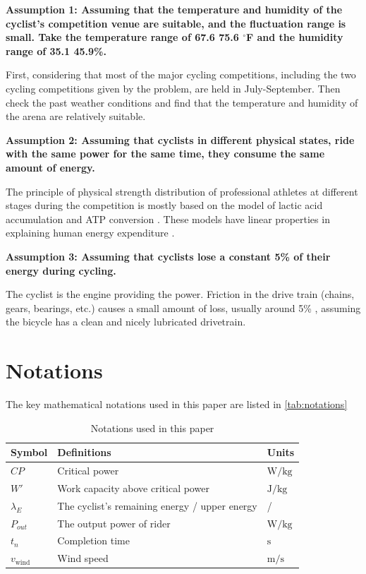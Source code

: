 \documentclass{mcmthesis}
\begin{document}
\noindent \textbf{Assumption 1: Assuming that the temperature and humidity of the cyclist’s competition venue
are suitable, and the fluctuation range is small. Take the temperature range of 67.6 \text{--} 75.6
$^\circ$F and the humidity range of 35.1 \text{--} 45.9\%.}

First, considering that most of the major cycling competitions, including the two cycling competitions given by the problem, are held in July-September. Then check the past weather conditions
and find that the temperature and humidity of the arena are relatively suitable.

\noindent \textbf{Assumption 2: Assuming that cyclists in different physical states, ride with the same power for
the same time, they consume the same amount of energy.}

The principle of physical strength distribution of professional athletes at different stages during
the competition is mostly based on the model of lactic acid accumulation and ATP conversion \cite{key6}.
These models have linear properties in explaining human energy expenditure \cite{key7}.

\noindent \textbf{Assumption 3: Assuming that cyclists lose a constant 5\% of their energy during cycling.}

The cyclist is the engine providing the power. Friction in the drive train (chains, gears, bearings,
etc.) causes a small amount of loss, usually around 5\% \cite{key8}, assuming the bicycle has a clean and
nicely lubricated drivetrain.
\section{Notations}
The key mathematical notations used in this paper are listed in \autoref{tab:notations}
\begin{table}[htbp]
\centering
\caption{Notations used in this paper}
\vspace{-0.4cm}
\label{tab:notations}
\begin{tabularx}{0.8\textwidth}{lll}
\toprule
Symbol & Definitions & Units \\
\midrule
$CP$        & Critical power                                   & $\mathrm{W/kg}$ \\
$W'$        & Work capacity above critical power               & $\mathrm{J/kg}$ \\
$\lambda_E$ & The cyclist's remaining energy / upper energy    & / \\
$P_{out}  $ & The output power of rider                   & $\mathrm{W/kg}$ \\
$t_n$       & Completion time                                  & $\mathrm{s}$ \\
$v_{\text{wind}}$ & Wind speed                                & $\mathrm{m/s}$ \\
\bottomrule
\end{tabularx}
\end{table}
\vspace{-0.4cm}
\end{document}
